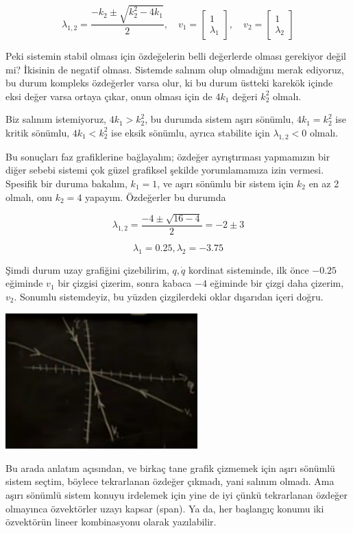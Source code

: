 \documentclass[12pt,fleqn]{article}\usepackage{../../common}
\begin{document}
$$ 
\lambda_{1,2} = \frac{-k_2 \pm \sqrt{k_2^2 - 4 k_1}}{2}, \quad
v_1 = \left[\begin{array}{r}
1 \\ \lambda_1
\end{array}\right], \quad 
v_2 = \left[\begin{array}{r}
1 \\ \lambda_2
\end{array}\right]
$$

Peki sistemin stabil olması için özdeğelerin belli değerlerde olması
gerekiyor değil mi? İkisinin de negatif olması. Sistemde salınım olup
olmadığını merak ediyoruz, bu durum kompleks özdeğerler varsa olur, ki bu
durum üstteki karekök içinde eksi değer varsa ortaya çıkar, onun olması
için de $4 k_1$ değeri $k_2^2$ olmalı. 

Biz salınım istemiyoruz, $4 k_1 > k_2^2$, bu durumda sistem aşırı sönümlu,
$4 k_1 = k_2^2$ ise kritik sönümlu, $4 k_1 < k_2^2$ ise eksik sönümlu,
ayrıca stabilite için $\lambda_{1,2} < 0$ olmalı.

Bu sonuçları faz grafiklerine bağlayalım; özdeğer ayrıştırması yapmamızın
bir diğer sebebi sistemi çok güzel grafiksel şekilde yorumlamamıza izin
vermesi. Spesifik bir duruma bakalım, $k_1 = 1$, ve aşırı sönümlu bir
sistem için $k_2$ en az 2 olmalı, onu $k_2 = 4$ yapayım. Özdeğerler bu
durumda  

$$
\lambda_{1,2} =  \frac{-4 \pm \sqrt{16-4}}{2} =
-2 \pm 3 
$$

$$
\lambda_1 = 0.25, \lambda_2 = -3.75
$$
 
Şimdi durum uzay grafiğini çizebilirim, $q,\dot{q}$ kordinat sisteminde,
ilk önce $-0.25$ eğiminde $v_1$ bir çizgisi çizerim,  sonra kabaca $-4$
eğiminde bir çizgi daha çizerim, $v_2$. Sonumlu sistemdeyiz, bu yüzden
çizgilerdeki oklar dışarıdan içeri doğru. 

\includegraphics[width=20em]{phy_control_02.png}

Bu arada anlatım açısından, ve birkaç tane grafik çizmemek için aşırı
sönümlü sistem seçtim, böylece tekrarlanan özdeğer çıkmadı, yani salınım
olmadı. Ama aşırı sönümlü sistem konuyu irdelemek için yine de iyi çünkü
tekrarlanan özdeğer olmayınca özvektörler uzayı kapsar (span). Ya da, her
başlangıç konumu iki özvektörün lineer kombinasyonu olarak yazılabilir.
\end{document}
